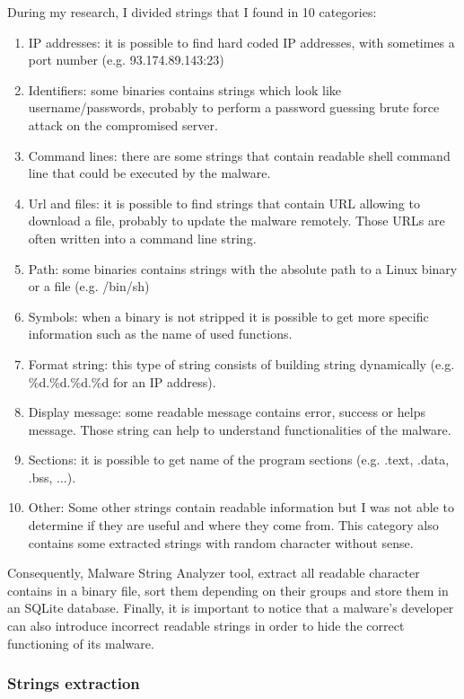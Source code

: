 During my research, I divided strings that I found in 10 categories:
\begin{enumerate}[label=\arabic*.]
  \item IP addresses: it is possible to find hard coded IP addresses, with sometimes a port
  number (e.g. 93.174.89.143:23)
  \item Identifiers: some binaries contains strings which look like username/passwords,
  probably to perform a password guessing brute force attack on the compromised server.
  \item Command lines:  there are some strings that contain readable shell command line
  that could be executed by the malware.
  \item Url and files: it is possible to find strings that contain URL allowing to download
  a file, probably to update the malware remotely. Those URLs are often written into a command line string.
  \item Path: some binaries contains strings with the absolute path to a Linux binary or a
  file (e.g. /bin/sh)
  \item Symbols: when a binary is not stripped it is possible to get more specific
  information such as the name of used functions.
  \item Format string: this type of string consists of building string dynamically
  (e.g. \%d.\%d.\%d.\%d for an IP address). 
  \item Display message: some readable message contains error, success or helps message.
  Those string can help to understand functionalities of the malware.
  \item Sections: it is possible to get name of the program sections (e.g. .text, .data,
  .bss, ...).
  \item Other: Some other strings contain readable information but I was not able to 
  determine if they are useful and where they come from. This category also contains 
  some extracted strings with random character without sense.
\end{enumerate}

Consequently, Malware String Analyzer tool, extract all readable character contains in a binary
file, sort them depending on their groups and store them in an SQLite database.
Finally, it is important to notice that a malware's developer can also introduce incorrect
readable strings in order to hide the correct functioning of its malware.


\subsubsection{Strings extraction} %

